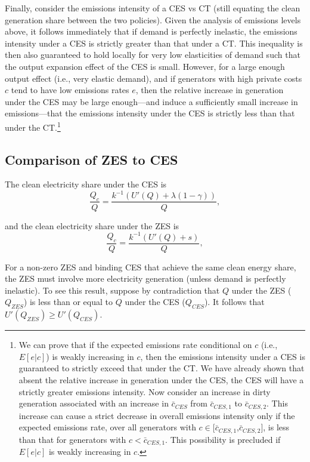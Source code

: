 \documentclass[12pt]{article}
\begin{document}
Finally, consider the emissions intensity of a CES vs CT (still equating the clean generation share between the two policies). Given the analysis of emissions levels above, it follows immediately that if demand is perfectly inelastic, the emissions intensity under a CES is strictly greater than that under a CT. This inequality is then also guaranteed to hold locally for very low elasticities of demand such that the output expansion effect of the CES is small. However, for a large enough output effect (i.e., very elastic demand), and if generators with high private costs $c$ tend to have low emissions rates $e$, then the relative increase in generation under the CES may be large enough---and induce a sufficiently small increase in emissions---that the emissions intensity under the CES is strictly less than that under the CT.\footnote{We can prove that if the expected emissions rate conditional on $c$ (i.e., $E[e|c]$) is weakly increasing in $c$, then the emissions intensity under a CES is guaranteed to strictly exceed that under the CT. We have already shown that absent the relative increase in generation under the CES, the CES will have a strictly greater emissions intensity. Now consider an increase in dirty generation associated with an increase in $\bar{c}_{CES}$ from $\bar{c}_{CES,1}$ to $\bar{c}_{CES,2}$. This increase can cause a strict decrease in overall emissions intensity only if the expected emissions rate, over all generators with $c\in[\bar{c}_{CES,1}$,$\bar{c}_{CES,2}]$, is less than that for generators with $c<\bar{c}_{CES,1}$. This possibility is precluded if $E[e|c]$ is weakly increasing in $c$.}




\subsection*{Comparison of ZES to CES}

The clean electricity share under the CES is 
\begin{equation}
    \frac{Q_c}{Q} = \frac{k^{-1}(U'(Q)+\lambda(1-\gamma))}{Q}, \label{appx:eq:cleanshareCES2}
\end{equation}

\noindent and the clean electricity share under the ZES is
\begin{equation}
    \frac{Q_c}{Q} = \frac{k^{-1}(U'(Q)+s)}{Q}, \label{appx:eq:cleanshareZES}
\end{equation}

For a non-zero ZES and binding CES that achieve the same clean energy share, the ZES must involve more electricity generation (unless demand is perfectly inelastic). To see this result, suppose by contradiction that $Q$ under the ZES ($Q_{ZES}$) is less than or equal to $Q$ under the CES ($Q_{CES}$). It follows that $U'(Q_{ZES})\geq U'(Q_{CES})$.
\end{document}
